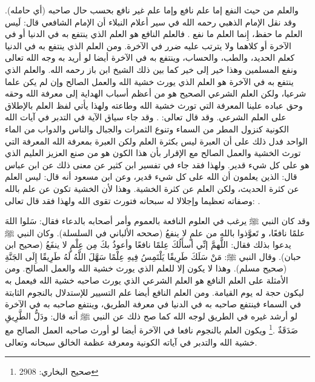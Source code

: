 والعلم من حيث النفع إما علم نافع وإما علم غير نافع بحسب حال صاحبه (أي حامله). 
وقد نقل الإمام الذهبي رحمه الله في سير أعلام النبلاء أن الإمام الشافعي قال: لَيس العلم ما حفظ، إِنما العلم ما نفع \href{https://shamela.ws/book/22669/4503#p3}{\faExternalLink} \cite{dahabi_Siyar}. فالعلم النافع هو العلم الذي ينتفع به في الدنيا أو في الآخرة أو كلاهما ولا يترتب عليه ضرر في الآخرة. ومن العلم الذي ينتفع به في الدنيا كعلم الحديد، والطب، والحساب، وينتفع به في الآخرة أيضا لو أريد به وجه الله تعالى ونفع المسلمين وهذا خير إلى خير كما بين ذلك الشيخ ابن باز رحمه الله. والعلم الذي ينتفع به في الآخرة هو العلم الذي يورث خشية الله والعمل الصالح وإن لم يكن علما شرعيا، ولكن العلم الشرعي الصحيح هو من أعظم أسباب الهداية إلى معرفة الله وحقه وحق عباده علينا المعرفة التي تورث خشية الله وطاعته ولهذا يأتي لفظ العلم بالإطلاق على العلم الشرعي. وقد قال تعالى: \quranayah*[35][28][8]{\footnotesize \surahname*[35]}. وقد جاء سياق الآية في التدبر في آيات الله الكونية كنزول المطر من السماء وتنوع الثمرات والجبال والناس والدواب من الماء الواحد فدل ذلك على أن العبرة ليس بكثرة العلم ولكن العبرة بمعرفة الله المعرفة التي تورث الخشية والعمل الصالح مع الإقرار بأن هذا الكون هو من صنع العزيز العليم الذي هو على كل شيء قدير. ولهذا فقد جاء في تفسير ابن كثير عن معنى ذلك عن ابن عباس قال: الذين يعلمون أن الله على كل شيء قدير، وعن ابن مسعود أنه قال: ليس العلم عن كثرة الحديث، ولكن العلم عن كثرة الخشية. وهذا لأن الخشية تكون عن علم بالله وصفاته تعظيما وإجلالا له سبحانه فتورث تقوى الله ولهذا فقد قال تعالى: \quranayah*[24][52]{\footnotesize \surahname*[24]}.

وقد كان النبي ﷺ يرغب في العلوم النافعة بالعموم وأمر أصحابه بالدعاء فقال: سَلوا اللهَ علمًا نافعًا، و تَعوَّذوا باللهِ من علمٍ لا ينفعُ {\footnotesize (صححه الألباني في السلسلة)}. وكان النبي ﷺ يدعوا بذلك فقال: اللَّهمَّ إنِّي أسأَلُكَ عِلمًا نافعًا وأعوذُ بكَ مِن عِلْمٍ لا ينفَعُ {\footnotesize (صحيح ابن حبان)}. وقال النبي ﷺ: مَنْ سَلَكَ طَرِيقًا يَلْتَمِسُ فِيهِ عِلْمًا سَهَّلَ اللَّهُ لَهُ طَرِيقًا إِلَى الجَنَّةِ {\footnotesize (صحيح مسلم)}. وهذا لا يكون إلا للعلم الذي يورث خشية الله والعمل الصالح. ومن الأمثلة على العلم النافع هو العلم الشرعي الذي يورث صاحبه خشية الله فيعمل به ليكون حجة له يوم القيامة. ومن العلم النافع أيضا علم التسيير للإستدلال بالنجوم الثابتة في السماء فينتفع صاحبه به في الدنيا في معرفة الطريق، وينتفع صاحبه به في الآخرة لو أرشد غيره في الطريق لوجه الله كما صح ذلك عن النبي ﷺ أنه قال: ودَلُّ الطَّرِيقِ صَدَقَةٌ \href{https://shamela.ws/book/1284/1840#p3}{\faExternalLink} \cite{bukhari}.\footnote{صحيح البخاري: 2908} ويكون العلم بالنجوم نافعا في الآخرة أيضا لو أورث صاحبه العمل الصالح مع خشية الله والتدبر في آياته الكونية ومعرفة عظمة الخالق سبحانه وتعالى. 

